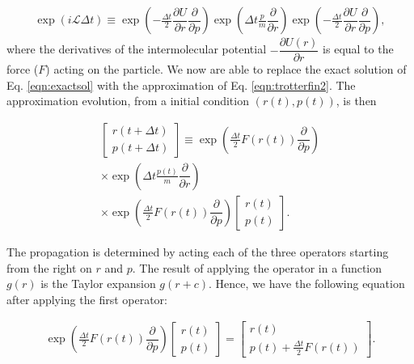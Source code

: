 \begin{equation}
\begin{aligned}
\exp (i\mathcal{L} \Delta t)  \equiv
\exp \left (-\frac{\Delta t}{2} \dfrac{\partial U}{\partial r} \dfrac{\partial}{\partial p} \right) \exp \left( \Delta t \frac{p}{m}\dfrac{\partial }{\partial r} \right)\exp \left (-\frac{\Delta t}{2} \dfrac{\partial U}{\partial r} \dfrac{\partial}{\partial p} \right) ,
\end{aligned}
\label{eqn:trotterfin2}
\end{equation} 
where the derivatives of the intermolecular potential $-\dfrac{\partial U(r)}{\partial r}$ is equal to the force ($F$) acting on the particle. We now are able to replace the exact solution of Eq. \ref{eqn:exactsol} with the approximation of Eq. \ref{eqn:trotterfin2}. The approximation evolution, from a initial condition $(r(t),p(t))$, is then

\begin{equation}
\begin{aligned}
\left[ \begin{array}{c} r(t+ \Delta t) \\ p(t + \Delta t) \end{array} \right] \equiv 
\exp \left (\frac{\Delta t}{2} F(r(t)) \dfrac{\partial}{\partial p} \right) \\
\times \exp \left( \Delta t \frac{p(t)}{m}\dfrac{\partial }{\partial r} \right) \\
\times \exp \left (\frac{\Delta t}{2} F(r(t)) \dfrac{\partial}{\partial p} \right)
\left[ \begin{array}{c} r(t) \\ p(t) \end{array} \right] .
\end{aligned}
\end{equation}

The propagation is determined by acting each of the three operators starting from the right on $r$ and $p$. The result of applying the operator in a function $g(r)$ is the Taylor expansion $g(r+c)$. Hence, we have the following equation after applying the first operator:

\begin{equation}
\begin{aligned}
\exp \left (\frac{\Delta t}{2} F(r(t)) \dfrac{\partial}{\partial p} \right)
\left[ \begin{array}{c} r(t) \\ p(t) \end{array} \right] = 
\left[ \begin{array}{c} r(t) \\ p(t) + \frac{\Delta t}{2} F(r(t)) \end{array} \right] .
\end{aligned}
\end{equation}

